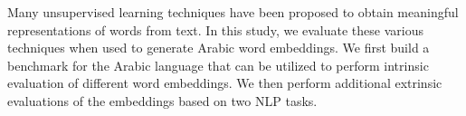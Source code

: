 Many unsupervised learning techniques have been proposed to obtain meaningful representations of words from text. In this study, we evaluate these various techniques when used to generate Arabic word embeddings. We first build a benchmark for the Arabic language that can be utilized to perform intrinsic evaluation of different word embeddings. We then perform additional extrinsic evaluations of the embeddings based on two NLP tasks.
